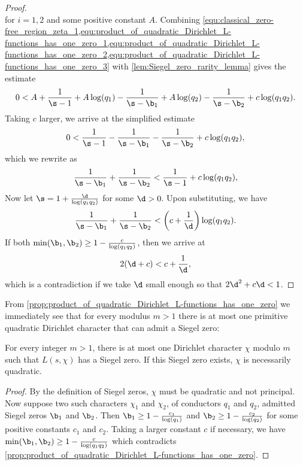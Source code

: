 \begin{proof}
\begin{equation}
        \end{equation}
        for $i = 1,2$ and some positive constant $A$. Combining \cref{equ:classical_zero-free_region_zeta_1,equ:product_of_quadratic_Dirichlet_L-functions_has_one_zero_1,equ:product_of_quadratic_Dirichlet_L-functions_has_one_zero_2,equ:product_of_quadratic_Dirichlet_L-functions_has_one_zero_3} with \cref{lem:Siegel_zero_rarity_lemma} gives the estimate
        \[
         0 < A+\frac{1}{\s-1}+A\log(q_{1})-\frac{1}{\s-\b_{1}}+A\log(q_{2})-\frac{1}{\s-\b_{2}}+c\log(q_{1}q_{2}).
        \]
        Taking $c$ larger, we arrive at the simplified estimate
        \[
          0 < \frac{1}{\s-1}-\frac{1}{\s-\b_{1}}-\frac{1}{\s-\b_{2}}+c\log(q_{1}q_{2}),
        \]
        which we rewrite as
        \[
          \frac{1}{\s-\b_{1}}+\frac{1}{\s-\b_{2}} < \frac{1}{\s-1}+c\log(q_{1}q_{2}),
        \]
        Now let $\s = 1+\frac{\d}{\log(q_{1}q_{2})}$ for some $\d > 0$. Upon substituting, we have
        \[
          \frac{1}{\s-\b_{1}}+\frac{1}{\s-\b_{2}} < \left(c+\frac{1}{\d}\right)\log(q_{1}q_{2}).
        \]
        If both $\min(\b_{1},\b_{2}) \ge 1-\frac{c}{\log(q_{1}q_{2})}$, then we arrive at
        \[
          2(\d+c) < c+\frac{1}{\d},
        \]
        which is a contradiction if we take $\d$ small enough so that $2\d^{2}+c\d < 1$.
      \end{proof}
      
       From \cref{prop:product_of_quadratic_Dirichlet_L-functions_has_one_zero} we immediately see that for every modulus $m > 1$ there is at most one primitive quadratic Dirichlet character that can admit a Siegel zero:

      \begin{proposition}\label{prop:at_most_one_Siegel_zero_per_modulus}
        For every integer $m > 1$, there is at most one Dirichlet character $\chi$ modulo $m$ such that $L(s,\chi)$ has a Siegel zero. If this Siegel zero exists, $\chi$ is necessarily quadratic.
      \end{proposition}
      \begin{proof}
        By the definition of Siegel zeros, $\chi$ must be quadratic and not principal. Now suppose two such characters $\chi_{1}$ and $\chi_{2}$, of conductors $q_{1}$ and $q_{2}$, admitted Siegel zeros $\b_{1}$ and $\b_{2}$. Then $\b_{1} \ge 1-\frac{c_{1}}{\log(q_{1})}$ and $\b_{2} \ge 1-\frac{c_{2}}{\log(q_{2})}$ for some positive constants $c_{1}$ and $c_{2}$. Taking a larger constant $c$ if necessary, we have $\min(\b_{1},\b_{2}) \ge 1-\frac{c}{\log(q_{1}q_{2})}$ which contradicts \cref{prop:product_of_quadratic_Dirichlet_L-functions_has_one_zero}.
      \end{proof}
